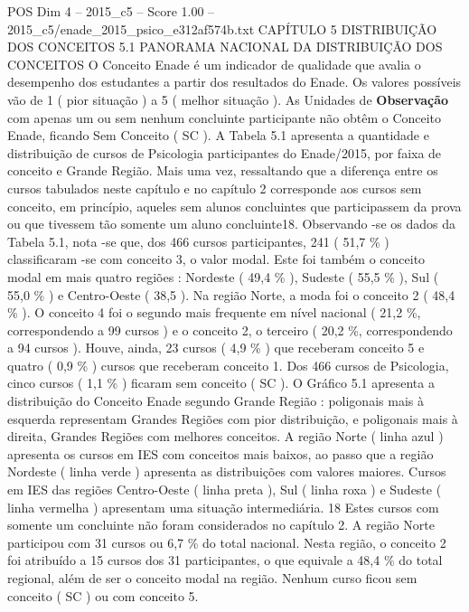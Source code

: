 \begin{textsample}{POS Dim 4 – 2015\_c5 – Score 1.00 – 2015\_c5/enade\_2015\_psico\_e312af574b.txt}  \label{ex:f4_pos_166}
CAPÍTULO 5 DISTRIBUIÇÃO DOS CONCEITOS 5.1 PANORAMA NACIONAL DA DISTRIBUIÇÃO DOS CONCEITOS O Conceito Enade é um indicador de qualidade que avalia o desempenho dos estudantes a partir dos resultados do Enade.
Os valores possíveis vão de 1 ( pior situação ) a 5 ( melhor situação ).
As Unidades de \textbf{Observação} com apenas um ou sem nenhum concluinte participante não obtêm o Conceito Enade, ficando Sem Conceito ( SC ).
A Tabela 5.1 apresenta a quantidade e distribuição de cursos de Psicologia participantes do Enade/2015, por faixa de conceito e Grande Região.
Mais uma vez, ressaltando que a diferença entre os cursos tabulados neste capítulo e no capítulo 2 corresponde aos cursos sem conceito, em princípio, aqueles sem alunos concluintes que participassem da prova ou que tivessem tão somente um aluno concluinte18.
Observando -se os dados da Tabela 5.1, nota -se que, dos 466 cursos participantes, 241 ( 51,7 \% ) classificaram -se com conceito 3, o valor modal.
Este foi também o conceito modal em mais quatro regiões : Nordeste ( 49,4 \% ), Sudeste ( 55,5 \% ), Sul ( 55,0 \% ) e Centro-Oeste ( 38,5 ).
Na região Norte, a moda foi o conceito 2 ( 48,4 \% ).
O conceito 4 foi o segundo mais frequente em nível nacional ( 21,2 \%, correspondendo a 99 cursos ) e o conceito 2, o terceiro ( 20,2 \%, correspondendo a 94 cursos ).
Houve, ainda, 23 cursos ( 4,9 \% ) que receberam conceito 5 e quatro ( 0,9 \% ) cursos que receberam conceito 1.
Dos 466 cursos de Psicologia, cinco cursos ( 1,1 \% ) ficaram sem conceito ( SC ).
O Gráfico 5.1 apresenta a distribuição do Conceito Enade segundo Grande Região : poligonais mais à esquerda representam Grandes Regiões com pior distribuição, e poligonais mais à direita, Grandes Regiões com melhores conceitos.
A região Norte ( linha azul ) apresenta os cursos em IES com conceitos mais baixos, ao passo que a região Nordeste ( linha verde ) apresenta as distribuições com valores maiores.
Cursos em IES das regiões Centro-Oeste ( linha preta ), Sul ( linha roxa ) e Sudeste ( linha vermelha ) apresentam uma situação intermediária. 18 Estes cursos com somente um concluinte não foram considerados no capítulo 2.
A região Norte participou com 31 cursos ou 6,7 \% do total nacional.
Nesta região, o conceito 2 foi atribuído a 15 cursos dos 31 participantes, o que equivale a 48,4 \% do total regional, além de ser o conceito modal na região.
Nenhum curso ficou sem conceito ( SC ) ou com conceito 5.

\end{textsample}

